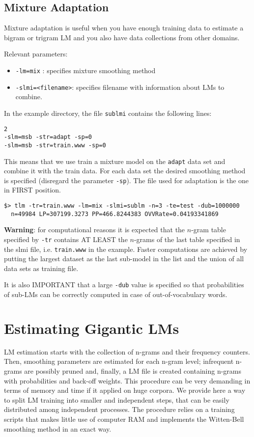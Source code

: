 \documentclass[11pt]{article}
\begin{document}
\subsection{Mixture Adaptation}

\noindent
Mixture adaptation  is useful  when you have  enough training  data to
estimate a  bigram or  trigram LM and  you also have  data collections
from other domains.

\noindent
Relevant parameters:
\begin{itemize}
\item {\tt-lm=mix} : specifies mixture smoothing method
\item {\tt -slmi=<filename>}: specifies filename with information about LMs to combine.
\end{itemize}

\noindent
In the example directory, the file {\tt sublmi} contains the following lines:
\begin{verbatim}
2
-slm=msb -str=adapt -sp=0
-slm=msb -str=train.www -sp=0
\end{verbatim}

\noindent
This means  that we use train a  mixture model on the  {\tt adapt} data set and
combine it  with the train data. For each data  set the desired
smoothing method is specified  (disregard the parameter {\tt -sp}). The file
used for adaptation is the one in FIRST position.

\begin{verbatim}
$> tlm -tr=train.www -lm=mix -slmi=sublm -n=3 -te=test -dub=1000000
  n=49984 LP=307199.3273 PP=466.8244383 OVVRate=0.04193341869
\end{verbatim}

\noindent
{\bf Warning}: for  computational reasons it  is expected that  the $n$-gram
table  specified by {\tt -tr}  contains AT  LEAST the  $n$-grams of  the last
table specified in the slmi file, i.e. {\tt train.www} in  the example.
Faster computations are achieved by putting the largest dataset as the
last sub-model in the list and the union of all data sets as training
file.

\noindent
It is  also IMPORTANT  that a  large {\tt -dub} value  is specified  so that
probabilities  of  sub-LMs  can  be  correctly  computed  in  case  of
out-of-vocabulary words.

\newpage
\section{Estimating Gigantic LMs}
\label{sec:giganticLM}
LM estimation starts with the collection of n-grams and their frequency counters. Then, 
smoothing parameters are estimated for each n-gram level; infrequent n-grams are
possibly pruned and, finally, a LM file is created containing n-grams with probabilities and 
back-off weights.  This procedure can be very demanding in terms of memory and
time if it applied on huge corpora.   We provide here a way to split LM training  into smaller and independent steps, that can be easily distributed among independent processes. The  
procedure relies on a training scripts that makes little use of computer RAM and implements 
the  Witten-Bell smoothing method in an exact way.  
\end{document}
